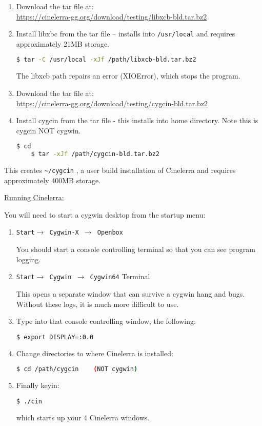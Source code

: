 \begin{enumerate}
	\item Download the tar file at:\\
	 {\small \url{https://cinelerra-gg.org/download/testing/libxcb-bld.tar.bz2}}
	\item Install libxbc from the tar file -- installs into \texttt{/usr/local} and requires approximately 21MB storage.
\begin{lstlisting}[language=bash,numbers=none]
	$ tar -C /usr/local -xJf /path/libxcb-bld.tar.bz2
\end{lstlisting}
The libxcb path repairs an error (XIOError), which stops the program.
	\item Download the tar file at:\\
	{\small \url{https://cinelerra-gg.org/download/testing/cygcin-bld.tar.bz2}}	
	\item Install cygcin from the tar file - this installs into home directory.  Note this is cygcin NOT cygwin.
\begin{lstlisting}[language=bash,numbers=none]
	$ cd
	$ tar -xJf /path/cygcin-bld.tar.bz2
\end{lstlisting}
\end{enumerate}
This creates \texttt{\~{}/cygcin} , a user build installation of Cinelerra and requires approximately 400MB storage.

\underline{Running Cinelerra:}

You will need to start a cygwin desktop from the startup menu:
\begin{enumerate}
	\item \texttt{Start$\rightarrow$ Cygwin-X $\rightarrow$ Openbox}

You should start a console controlling terminal so that you can see program logging.
	\item \texttt{Start$\rightarrow$ Cygwin $\rightarrow$ Cygwin64} Terminal

This opens a separate window that can survive a cygwin hang and bugs. Without these logs, it is much more difficult to use.

	\item Type into that console controlling window, the following:
\begin{lstlisting}[language=bash,numbers=none]
	$ export DISPLAY=:0.0
\end{lstlisting}
	\item Change directories to where Cinelerra is installed:
\begin{lstlisting}[language=bash,numbers=none]
	$ cd /path/cygcin    (NOT cygwin)
\end{lstlisting}
	\item Finally keyin:
\begin{lstlisting}[language=bash,numbers=none]
	$ ./cin
\end{lstlisting}
which starts up your 4 Cinelerra windows.
\end{enumerate}

